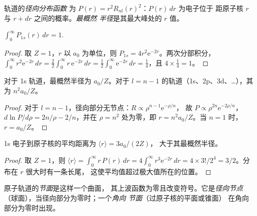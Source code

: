 \begin{definition}[径向分布]\label{def:b2:atomic-orbitals:radial-distribution}
轨道的\emph{径向分布函数}
为 $P(r) = r^2R_{nl}(r)^2$：$P(r)\,dr$ 为电子位于
距原子核 $r$ 与 $r + dr$ 之间的概率。\emph{最概然
半径}是其最大峰处的 $r$ 值。
\end{definition}

\begin{proposition}[1s 的归一化]\label{prop:b2:atomic-orbitals:normalised}
$\int_0^\infty P_{1s}(r)\,dr = 1$.
\end{proposition}

\begin{proof}
取 $Z = 1$，$r$ 以 $a_0$ 为单位，则 $P_{1s} = 4r^2\mathrm e^{-2r}$。两次分部积分，
$\int_0^\infty r^2\mathrm e^{-2r}\,dr = \frac22\int_0^\infty r\,\mathrm e^{-2r}\,dr =
\frac12\int_0^\infty\mathrm e^{-2r}\,dr = \frac14$，且 $4 \times \frac14 = 1$。
\end{proof}

\begin{proposition}[最概然半径]\label{prop:b2:atomic-orbitals:most-probable}
对于 1s 轨道，最概然半径为 $a_0/Z$。对于 $l =
n - 1$ 的轨道（1s、2p、3d、\dots），其为 $n^2a_0/Z$。
\end{proposition}

\begin{proof}
对于 $l = n - 1$，径向部分无节点：$R \propto \rho^{n-1}\mathrm e^{-\rho/n}$，
故 $P \propto \rho^{2n}\mathrm e^{-2\rho/n}$，$d\ln P/d\rho = 2n/\rho - 2/n$，并在
$\rho = n^2$ 处为零，即 $r = n^2a_0/Z$。当 $n = 1$ 时，$r = a_0/Z$。
\end{proof}

\begin{proposition}[1s 电子的平均半径]\label{prop:b2:atomic-orbitals:mean-radius}
1s 电子到原子核的平均距离为 $\langle r\rangle = 3a_0/(2Z)$，
大于其最概然半径。
\end{proposition}

\begin{proof}
取 $Z = 1$，则 $\langle r\rangle = \int_0^\infty r\,P(r)\,dr = 4\int_0^\infty r^3\mathrm e^{-2r}
\,dr = 4 \times 3!/2^4 = 3/2$。分布在 $r$ 很大时有一条长尾，
这使平均值超过极大值所在的位置。
\end{proof}

\begin{definition}[节点]\label{def:b2:atomic-orbitals:node}
原子轨道的\emph{节面}是这样一个曲面，
其上波函数为零且改变符号。它是\emph{径向节点}
（球面），当径向部分为零时；一个\emph{角向
节面}（过原子核的平面或锥面）
在角向部分为零时出现。
\end{definition}

